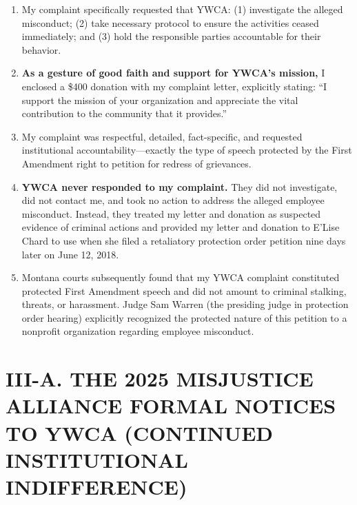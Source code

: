 \documentclass[12pt,letterpaper]{article}
\begin{document}
\begin{enumerate}
\item My complaint specifically requested that YWCA: (1) investigate the alleged misconduct; (2) take necessary protocol to ensure the activities ceased immediately; and (3) hold the responsible parties accountable for their behavior.

\item \textbf{As a gesture of good faith and support for YWCA's mission,} I enclosed a \$400 donation with my complaint letter, explicitly stating: ``I support the mission of your organization and appreciate the vital contribution to the community that it provides.''

\item My complaint was respectful, detailed, fact-specific, and requested institutional accountability---exactly the type of speech protected by the First Amendment right to petition for redress of grievances.

\item \textbf{YWCA never responded to my complaint.} They did not investigate, did not contact me, and took no action to address the alleged employee misconduct. Instead, they treated my letter and donation as suspected evidence of criminal actions and provided my letter and donation to E'Lise Chard to use when she filed a retaliatory protection order petition nine days later on June 12, 2018.

\item Montana courts subsequently found that my YWCA complaint constituted protected First Amendment speech and did not amount to criminal stalking, threats, or harassment. Judge Sam Warren (the presiding judge in protection order hearing) explicitly recognized the protected nature of this petition to a nonprofit organization regarding employee misconduct.

\end{enumerate}





\section*{III-A. THE 2025 MISJUSTICE ALLIANCE FORMAL NOTICES TO YWCA (CONTINUED INSTITUTIONAL INDIFFERENCE)}
\end{document}

